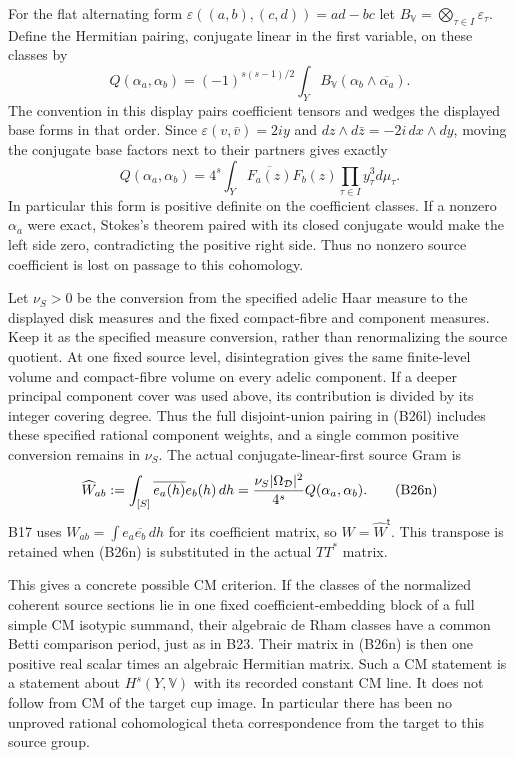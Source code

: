 \documentclass[11pt]{article}
\providecommand{\mathscr}[1]{\mathcal{#1}}
\theoremstyle{definition}\newtheorem{definition}[theorem]{Definition}\newtheorem{remark}[theorem]{Remark}
\begin{document}
For the flat alternating form
$\varepsilon((a,b),(c,d))=ad-bc$ let
$B_{\mathbb V}=\bigotimes_{\tau\in I}\varepsilon_\tau$.
Define the Hermitian pairing, conjugate linear in the first
variable, on these classes by
\[
 Q(\alpha_a,\alpha_b)=
  (-1)^{s(s-1)/2}
     \int_Y B_{\mathbb V}(\alpha_b\wedge\overline{\alpha_a}).
 \tag{B26l}
\]
The convention in this display pairs coefficient tensors and
wedges the displayed base forms in that order.  Since
$\varepsilon(v,\bar v)=2iy$ and
$dz\wedge d\bar z=-2i\,dx\wedge dy$, moving the conjugate
base factors next to their partners gives exactly
\[
 Q(\alpha_a,\alpha_b)=
       4^s\int_Y\overline{F_a(z)}F_b(z)
                     \prod_{\tau\in I}y_\tau^3d\mu_\tau.
 \tag{B26m}
\]
In particular this form is positive definite on the
coefficient classes.  If a nonzero $\alpha_a$ were exact,
Stokes's theorem paired with its closed conjugate would make
the left side zero, contradicting the positive right side.
Thus no nonzero source coefficient is lost on passage to
this cohomology.

Let $\nu_S>0$ be the conversion from the specified adelic
Haar measure to the displayed disk measures and the fixed
compact-fibre and component measures.  Keep it as the
specified measure conversion, rather than renormalizing the
source quotient.  At one fixed source level, disintegration
gives the same finite-level volume and compact-fibre volume
on every adelic component.  If a deeper principal component
cover was used above, its contribution is divided by its
integer covering degree.  Thus the full disjoint-union
pairing in (B26l) includes these specified rational component
weights, and a single common positive conversion remains
in $\nu_S$.  The actual
conjugate-linear-first source Gram is
\[
 \widehat W_{ab}:=\int_{[S]}\overline{e_a(h)}e_b(h)\,dh
      ={\nu_S|\Omega_{\mathscr D}|^2\over4^s}
                                      Q(\alpha_a,\alpha_b).
 \tag{B26n}
\]
B17 uses $W_{ab}=\int e_a\overline{e_b}\,dh$ for its
coefficient matrix, so $W=\widehat W^{\mathsf t}$.
This transpose is retained when (B26n) is substituted in
the actual $TT^*$ matrix.

This gives a concrete possible CM criterion.  If the classes
of the normalized coherent source sections lie in one fixed
coefficient-embedding block of a full simple CM isotypic
summand, their algebraic de Rham classes
have a common Betti comparison period, just as in B23.
Their matrix in (B26n) is then one positive real scalar
times an algebraic Hermitian matrix.  Such a CM statement
is a statement about $H^s(Y,\mathbb V)$ with its recorded
constant CM line.  It does not follow from CM of the target
cup image.  In particular there has been no unproved
rational cohomological theta correspondence from the target
to this source group.
\end{document}
